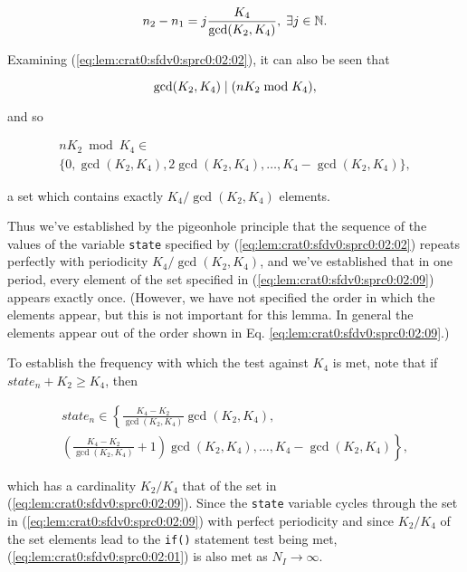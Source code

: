 \begin{vworklemmaproof}
\begin{equation}
\label{eq:lem:crat0:sfdv0:sprc0:02:07}
n_2 - n_1 = j \frac{K_4}{\gcd(K_2, K_4)}, \; \exists j \in {\mathbb{N}} .
\end{equation} 

Examining (\ref{eq:lem:crat0:sfdv0:sprc0:02:02}), it can
also be seen that 

\begin{equation}
\label{eq:lem:crat0:sfdv0:sprc0:02:08}
\gcd(K_2, K_4) \mid (n K_2 \bmod K_4),
\end{equation} 

and so

\begin{eqnarray}
\label{eq:lem:crat0:sfdv0:sprc0:02:09}
& n K_2 \bmod K_4 \in & \\
\nonumber 
& \{ 0, \gcd(K_2, K_4), 2 \gcd(K_2, K_4), \ldots , K_4 - \gcd(K_2, K_4) \} , &
\end{eqnarray} 

a set which contains exactly $K_4/\gcd(K_2, K_4)$ elements.

Thus we've established by the pigeonhole principle 
that the sequence of the
values of the variable \texttt{state}
specified by (\ref{eq:lem:crat0:sfdv0:sprc0:02:02})
repeats perfectly with periodicity $K_4/\gcd(K_2, K_4)$,
and we've established that in one period, every element of the set
specified in (\ref{eq:lem:crat0:sfdv0:sprc0:02:09}) appears exactly
once.  (However, we have not specified the order in which the 
elements appear, but this is not important for this lemma.  In general
the elements appear out of the order shown in 
Eq. \ref{eq:lem:crat0:sfdv0:sprc0:02:09}.)

To establish the frequency with which the test against
$K_4$ is met, note that if $state_n + K_2 \geq K_4$, then

\begin{eqnarray}
\label{eq:lem:crat0:sfdv0:sprc0:02:10}
& \displaystyle{state_n \in  \left\{ \frac{K_4-K_2}{\gcd(K_2,K_4)} \gcd(K_2, K_4), \right.} & \\
\nonumber & \displaystyle{\left. \left(\frac{K_4-K_2}{\gcd(K_2,K_4)} + 1 \right) \gcd(K_2, K_4), \ldots ,
K_4 - \gcd(K_2, K_4)\right\} ,} &
\end{eqnarray} 

which has a cardinality $K_2/K_4$ that of the set in 
(\ref{eq:lem:crat0:sfdv0:sprc0:02:09}).  Since the 
\texttt{state} variable cycles through the set in 
(\ref{eq:lem:crat0:sfdv0:sprc0:02:09}) with perfect periodicity and since
$K_2/K_4$ of the set elements lead to the \texttt{if()} statement
test being
met, (\ref{eq:lem:crat0:sfdv0:sprc0:02:01}) is also met as 
$N_I\rightarrow\infty$.


\end{vworklemmaproof}
